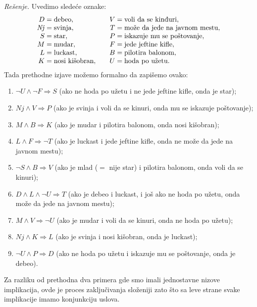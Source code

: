 \noindent
\textit{Re\v senje.}
Uvedimo slede\'ce oznake:
\newcommand\NJ{\mathit{Nj}}%
$$
  \begin{array}{r@{\;=\;}l@{\qquad}r@{\;=\;}l}
  D   & \text{debeo},              & V    & \text{voli da se kin\dj uri},\\
  \NJ & \text{svinja},             & T    & \text{mo\v ze da jede na javnom mestu},\\
  S   & \text{star},               & P    & \text{iskazuje mu se po\v stovanje},\\
  M   & \text{mudar},              & F    & \text{jede jeftine kifle},\\
  L   & \text{luckast},            & B    & \text{pilotira balonom},\\
  K   & \text{nosi ki\v sobran},   & U    & \text{hoda po u\v zetu}.\\
  \end{array}
$$
Tada prethodne izjave mo\v zemo formalno da zapi\v semo ovako:
\begin{enumerate}
\item%
  $\lnot U \land \lnot F \Rightarrow S$
  (ako ne hoda po u\v zetu i ne jede jeftine kifle, onda je star);
\item%
  $\NJ \land V \Rightarrow P$
  (ako je svinja i voli da se kin\dj uri, onda mu se iskazuje po\v stovanje);
\item%
  $M \land B \Rightarrow K$
  (ako je mudar i pilotira balonom, onda nosi ki\v sobran);
\item%
  $L \land F \Rightarrow \lnot T$
  (ako je luckast i jede jeftine kifle, onda ne mo\v ze da jede na javnom mestu);
\item%
  $\lnot S \land B \Rightarrow V$
  (ako je mlad ($=$ nije star) i pilotira balonom, onda voli da se kin\dj uri);
\item%
  $D \land L \land \lnot U \Rightarrow T$
  (ako je debeo i luckast, i jo\v s ako ne hoda po u\v zetu, onda mo\v ze da jede na javnom mestu);
\item%
  $M \land V \Rightarrow \lnot U$
  (ako je mudar i voli da se kin\dj uri, onda ne hoda po u\v zetu);
\item%
  $\NJ \land K \Rightarrow L$
  (ako je svinja i nosi ki\v sobran, onda je luckast);
\item%
  $\lnot U \land P \Rightarrow D$
  (ako ne hoda po u\v zetu i iskazuje mu se po\v stovanje, onda je debeo).
\end{enumerate}
Za razliku od prethodna dva primera gde smo imali jednostavne nizove implikacija, ovde je proces zaklju\v civanja slo\v zeniji
zato \v sto sa leve strane svake implikacije imamo konjunkciju uslova.

